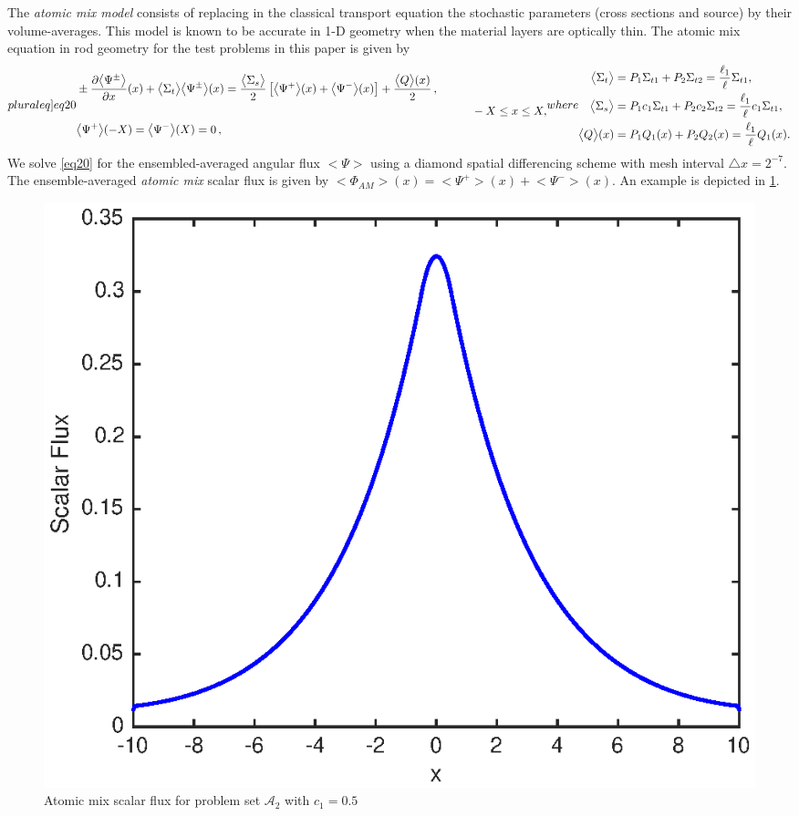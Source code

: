 \documentclass[12pt]{article}
\newcommand{\bl}{\big<}
\newcommand{\bg}{\big>}
\newcommand{\seta}{\mathcal{A}}
\begin{document}
{The {\em atomic mix model} \cite{pom91,dum00} consists of replacing in the classical transport equation the stochastic parameters (cross sections and source) by their volume-averages.
This model is known to be accurate in 1-D geometry when the material layers are optically thin.
The atomic mix equation in rod geometry for the test problems in this paper is given by
\begin{subequations}\label[pluraleq]{eq20}
\begin{align}\label{eq19a}
&\pm \frac{\partial \bl\Psi^{\pm}\bg}{\partial x}(x) + \bl\Sigma_t\bg\bl\Psi^{\pm}\bg(x) 
= \frac{\bl\Sigma_s\bg}{2}\left[\bl\Psi^{+}\bg(x)+\bl\Psi^{-}\bg(x)\right]+ \frac{\bl Q\bg(x)}{2}\,,\\
& \hspace{12cm} -X\leq x\leq X,\nonumber\\
&\bl\Psi^+\bg(-X) = \bl\Psi^-\bg(X) = 0\,,
\end{align}
where 
\begin{align}
\bl\Sigma_t\bg &= P_1\Sigma_{t1} + P_2\Sigma_{t2} = \frac{\ell_1}{\ell}\Sigma_{t1},\\
\bl\Sigma_s\bg &= P_1c_1\Sigma_{t1} + P_2c_2\Sigma_{t2} = \frac{\ell_1}{\ell}c_1\Sigma_{t1},\\
\bl Q\bg(x) &= P_1 Q_1(x) + P_2 Q_2(x) = \frac{\ell_1}{\ell}Q_1(x). \label{eq20e}
\end{align}
\end{subequations}
We solve \cref{eq20} for the ensembled-averaged angular flux $\bl\Psi\bg$ using a diamond spatial differencing scheme with mesh interval $\triangle x=2^{-7}$.
The ensemble-averaged {\em atomic mix} scalar flux is given by $\bl\Phi_{AM}\bg(x) = \bl\Psi^+\bg(x)+\bl\Psi^-\bg(x)$.
An example is depicted in \cref{fig5}.
\begin{figure}[htb]
  \centering
  \includegraphics[scale=1]{fig5.eps}
  \caption{Atomic mix scalar flux for problem set {$\seta_2$} with $c_1=0.5$}
  \label{fig5}
\end{figure}

}
\end{document}
